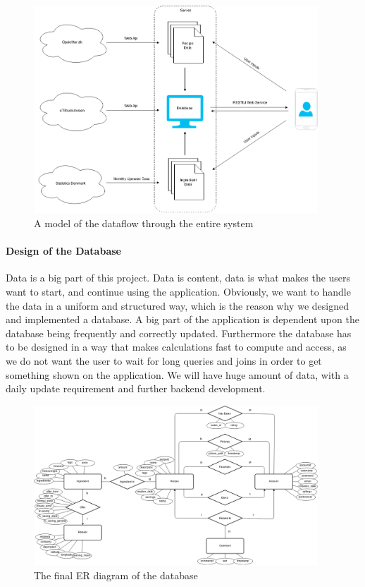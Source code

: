 \begin{figure}
\label{fig:dataflow}
\centering
\includegraphics[width=0.95\textwidth]{Pictures/dataflow}
\caption{A model of the dataflow through the entire system}
\end{figure}

\paragraph{Design of the Database}
\label{para:dbdesign}

Data is a big part of this project. Data is content, data is what makes the users want to start, and continue using the application. Obviously, we want to handle the data in a uniform and structured way, which is the reason why we designed and implemented a database. A big part of the application is dependent upon the database being frequently and correctly updated. Furthermore the database has to be designed in a way that makes calculations fast to compute and access, as we do not want the user to wait for long queries and joins in order to get something shown on the application. We will have huge amount of data, with a daily update requirement and further backend development.



\begin{figure}
\label{fig:ER-diagram}
\centering
\includegraphics[width=0.95\textwidth]{Pictures/ERdiagram}
\caption{The final ER diagram of the database}
\end{figure}

